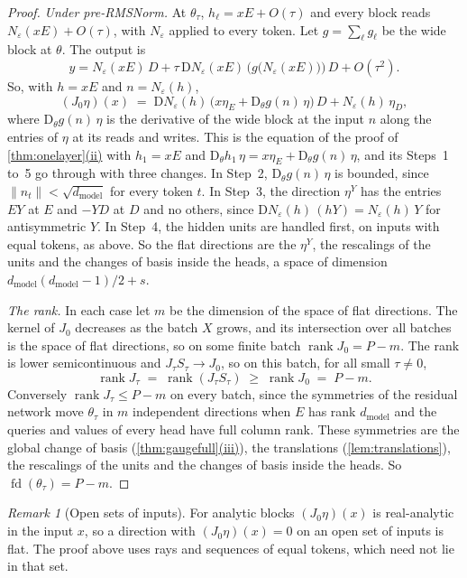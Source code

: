\documentclass[10pt]{article}
\theoremstyle{definition}
\theoremstyle{remark}
\newtheorem*{remark*}{Remark}
\newcommand{\dm}{d_{\mathrm{model}}}
\newcommand{\Der}{\mathrm{D}}
\newcommand{\norm}[1]{\lVert #1\rVert}
\DeclareRobustCommand{\cpref}[2]{\hyperref[#1:#2]{\cref*{#1}(#2)}}
\begin{document}
\begin{proof}
\emph{Under pre-RMSNorm.} At $\theta_\tau$, $h_\ell = xE + O(\tau)$ and every block reads $N_\varepsilon(xE) + O(\tau)$, with $N_\varepsilon$ applied to every token. Let $g = \sum_\ell g_\ell$ be the wide block at $\theta$. The output is
\[
y = N_\varepsilon(xE)\,D + \tau\,\Der N_\varepsilon(xE)\,\Big(g\big(N_\varepsilon(xE)\big)\Big)\,D + O(\tau^2).
\]
So, with $h = xE$ and $n = N_\varepsilon(h)$,
\[
(J_0\eta)(x) \;=\; \Der N_\varepsilon(h)\,\big(x\eta_E + \Der_\theta g(n)\,\eta\big)\,D + N_\varepsilon(h)\,\eta_D ,
\]
where $\Der_\theta g(n)\,\eta$ is the derivative of the wide block at the input $n$ along the entries of $\eta$ at its reads and writes. This is the equation of the proof of \cpref{thm:onelayer}{ii} with $h_1 = xE$ and $\Der_\theta h_1\,\eta = x\eta_E + \Der_\theta g(n)\,\eta$, and its Steps~1 to~5 go through with three changes. In Step~2, $\Der_\theta g(n)\,\eta$ is bounded, since $\norm{n_t} < \sqrt{\dm}$ for every token $t$. In Step~3, the direction $\eta^Y$ has the entries $EY$ at $E$ and $-YD$ at $D$ and no others, since $\Der N_\varepsilon(h)\,(hY) = N_\varepsilon(h)\,Y$ for antisymmetric $Y$. In Step~4, the hidden units are handled first, on inputs with equal tokens, as above. So the flat directions are the $\eta^Y$, the rescalings of the units and the changes of basis inside the heads, a space of dimension $\dm(\dm-1)/2 + s$.

\emph{The rank.} In each case let $m$ be the dimension of the space of flat directions. The kernel of $J_0$ decreases as the batch $X$ grows, and its intersection over all batches is the space of flat directions, so on some finite batch $\operatorname{rank} J_0 = P - m$. The rank is lower semicontinuous and $J_\tau S_\tau \to J_0$, so on this batch, for all small $\tau \neq 0$,
\[
\operatorname{rank} J_\tau \;=\; \operatorname{rank}(J_\tau S_\tau) \;\ge\; \operatorname{rank} J_0 \;=\; P - m .
\]
Conversely $\operatorname{rank} J_\tau \le P - m$ on every batch, since the symmetries of the residual network move $\theta_\tau$ in $m$ independent directions when $E$ has rank $\dm$ and the queries and values of every head have full column rank. These symmetries are the global change of basis (\cpref{thm:gaugefull}{iii}), the translations (\cref{lem:translations}), the rescalings of the units and the changes of basis inside the heads. So $\operatorname{fd}(\theta_\tau) = P - m$.
\end{proof}

\begin{remark*}[Open sets of inputs]
For analytic blocks $(J_0\eta)(x)$ is real-analytic in the input $x$, so a direction with $(J_0\eta)(x) = 0$ on an open set of inputs is flat. The proof above uses rays and sequences of equal tokens, which need not lie in that set.
\end{remark*}
\end{document}
